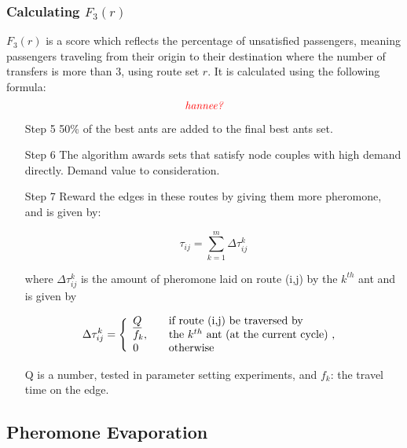 

\subsubsection{Calculating $F_3(r)$}
$F_3(r)$ is a score which reflects the percentage of unsatisfied passengers, meaning passengers traveling from their origin to their destination where the number of transfers is more than 3, using route set $r$. It is calculated using the following formula:
$$\emph{\color{red}hannee?}$$

\begin{itemize}
\item[Step 5] 50\% of the best ants are added to the final best ants set.
\item[Step 6] The algorithm awards sets that satisfy node couples with high demand directly. Demand value to consideration.
\item[Step 7] Reward the edges in these routes by giving them more pheromone, and is given by:

$$ \tau_{ij} = \sum_{k=1}^{m} \Delta \tau^k_{ij}$$

where $ \Delta \tau^k_{ij} $ is the amount of pheromone laid on route (i,j) by the $k^{th}$ ant and is given by

$$
\Delta \tau^k_{ij} = \Bigg\{
\begin{array}{l l}
\underline{Q} &  \quad \text{if route (i,j) be traversed by}\\
f_k, &  \quad \text{the $k^{th}$ ant (at the current cycle) , }\\
0 &  \quad \text{otherwise}
\end{array}
$$

Q is a number, tested in parameter setting experiments, and $f_k$: the travel time on the edge.

\end{itemize}

\subsection{Pheromone Evaporation}

